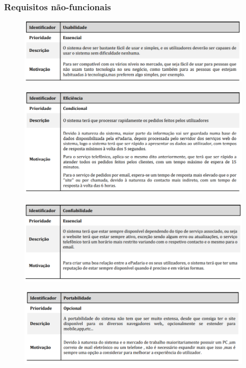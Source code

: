 \subsubsection{Requisitos não-funcionais}

\begin{figure}[h]
	\centering
	\includegraphics{requisito_nao_funcional1}
	\caption{}
	\label{fig:requisitonaofuncional1}
\end{figure}

\begin{figure}[h]
	\centering
	\includegraphics{requisito_nao_funcional2}
	\caption{}
	\label{fig:requisitonaofuncional2}
\end{figure}

\begin{figure}[h]
	\centering
	\includegraphics{requisito_nao_funcional3}
	\caption{}
	\label{fig:requisitonaofuncional3}
\end{figure}

\begin{figure}[h]
	\centering
	\includegraphics{requisito_nao_funcional4}
	\caption{}
	\label{fig:requisitonaofuncional4}
\end{figure}


